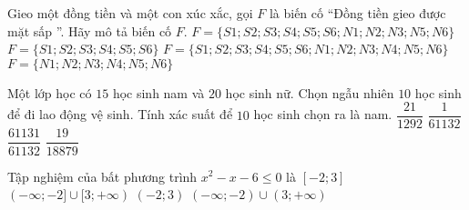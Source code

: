 \begin{ex}%
Gieo một đồng tiền và một con xúc xắc, gọi $F$ là biến cố ``Đồng tiền gieo được mặt sấp ''. Hãy mô tả biến cố $F$. 
\choice
{$F=\{S 1;S 2;S 3;S 4;S 5;S 6;N 1;N 2;N 3;N 5;N 6\}$}
{\True $F=\{S 1;S 2;S 3;S 4;S 5;S 6\}$}
{$F=\{S 1;S 2;S 3;S 4;S 5;S 6;N 1;N 2;N 3;N 4;N 5;N 6\}$}
{$F=\{N 1;N 2;N 3;N 4;N 5;N 6\}$}
\end{ex}
\begin{ex}%
Một lớp học có $15$ học sinh nam và $20$ học sinh nữ. Chọn ngẫu nhiên $10$ học sinh để đi lao động vệ sinh. Tính xác suất để $10$ học sinh chọn ra là nam. 
\choice
{$\dfrac{21}{1292}$}
{\True $\dfrac1{61132}$}
{$\dfrac{61131}{61132}$}
{$\dfrac{19}{18879}$}
\end{ex}
\begin{ex}%
Tập nghiệm của bất phương trình $x^2-x-6 \leq 0$ là 
\choice
{\True $[-2;3]$}
{$(-\infty;-2] \cup[3;+\infty)$}
{$(-2;3)$}
{$(-\infty;-2) \cup(3;+\infty)$}
\end{ex}


